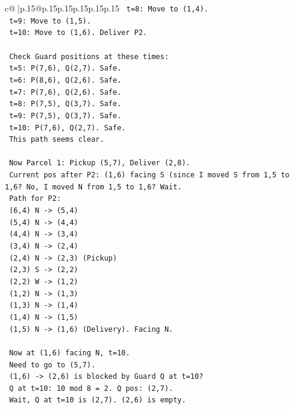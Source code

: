 \documentclass{article}
\begin{document}
{\begin{supertabular}{c@{$\;$}|p{.15\linewidth}@{}p{.15\linewidth}p{.15\linewidth}p{.15\linewidth}p{.15\linewidth}p{.15\linewidth}}
{{{\texttt{    t=8: Move to (1,4).} \\
\texttt{    t=9: Move to (1,5).} \\
\texttt{    t=10: Move to (1,6). Deliver P2.} \\
\\ 
\texttt{    Check Guard positions at these times:} \\
\texttt{    t=5: P(7,6), Q(2,7). Safe.} \\
\texttt{    t=6: P(8,6), Q(2,6). Safe.} \\
\texttt{    t=7: P(7,6), Q(2,6). Safe.} \\
\texttt{    t=8: P(7,5), Q(3,7). Safe.} \\
\texttt{    t=9: P(7,5), Q(3,7). Safe.} \\
\texttt{    t=10: P(7,6), Q(2,7). Safe.} \\
\texttt{    This path seems clear.} \\
\\ 
\texttt{    Now Parcel 1: Pickup (5,7), Deliver (2,8).} \\
\texttt{    Current pos after P2: (1,6) facing S (since I moved S from 1,5 to 1,6? No, I moved N from 1,5 to 1,6? Wait.} \\
\texttt{    Path for P2:} \\
\texttt{    (6,4) N {-}> (5,4)} \\
\texttt{    (5,4) N {-}> (4,4)} \\
\texttt{    (4,4) N {-}> (3,4)} \\
\texttt{    (3,4) N {-}> (2,4)} \\
\texttt{    (2,4) N {-}> (2,3) (Pickup)} \\
\texttt{    (2,3) S {-}> (2,2)} \\
\texttt{    (2,2) W {-}> (1,2)} \\
\texttt{    (1,2) N {-}> (1,3)} \\
\texttt{    (1,3) N {-}> (1,4)} \\
\texttt{    (1,4) N {-}> (1,5)} \\
\texttt{    (1,5) N {-}> (1,6) (Delivery). Facing N.} \\
\\ 
\texttt{    Now at (1,6) facing N, t=10.} \\
\texttt{    Need to go to (5,7).} \\
\texttt{    (1,6) {-}> (2,6) is blocked by Guard Q at t=10?} \\
\texttt{    Q at t=10: 10 mod 8 = 2. Q pos: (2,7).} \\
\texttt{    Wait, Q at t=10 is (2,7). (2,6) is empty.} \\
}}}
\end{supertabular}}
\end{document}
